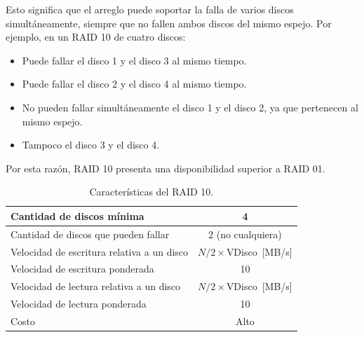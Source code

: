 Esto significa que el arreglo puede soportar la falla de varios discos simultáneamente, siempre que no fallen ambos discos del mismo espejo. Por ejemplo, en un RAID 10 de cuatro discos:
\begin{itemize}
  \item Puede fallar el disco 1 y el disco 3 al mismo tiempo.
  \item Puede fallar el disco 2 y el disco 4 al mismo tiempo.
  \item No pueden fallar simultáneamente el disco 1 y el disco 2, ya que pertenecen al mismo espejo.
  \item Tampoco el disco 3 y el disco 4.
\end{itemize}
Por esta razón, RAID 10 presenta una disponibilidad superior a RAID 01.

\begin{table}[!ht]
  \centering
  \begin{tabular}{l|c}
    Cantidad de discos mínima & 4 \\\hline
    Cantidad de discos que pueden fallar & 2 (no cualquiera) \\ \hline
    Velocidad de escritura relativa a un disco & \(N/2\times\)VDisco~[MB/s] \\\hline
    Velocidad de escritura ponderada & 10 \\ \hline
    Velocidad de lectura relativa a un disco & \(N/2\times\)VDisco~[MB/s] \\ \hline
    Velocidad de lectura ponderada & 10 \\ \hline
    Costo & Alto
  \end{tabular}
  \caption{Características del RAID 10.}
\end{table}
